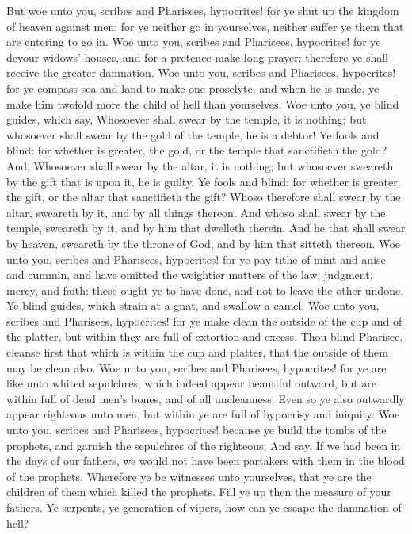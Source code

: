  But woe unto you, scribes and Pharisees, hypocrites! for
ye shut up the kingdom of heaven against men: for ye neither go in
yourselves, neither suffer ye them that are entering to go in.
 Woe unto you, scribes and Pharisees, hypocrites! for ye
devour widows' houses, and for a pretence make long prayer: therefore ye
shall receive the greater damnation.  Woe unto you, scribes
and Pharisees, hypocrites! for ye compass sea and land to make one
proselyte, and when he is made, ye make him twofold more the child of
hell than yourselves.  Woe unto you, ye blind guides, which
say, Whosoever shall swear by the temple, it is nothing; but whosoever
shall swear by the gold of the temple, he is a debtor!  Ye
fools and blind: for whether is greater, the gold, or the temple that
sanctifieth the gold?  And, Whosoever shall swear by the
altar, it is nothing; but whosoever sweareth by the gift that is upon
it, he is guilty.  Ye fools and blind: for whether is
greater, the gift, or the altar that sanctifieth the gift? 
Whoso therefore shall swear by the altar, sweareth by it, and by all
things thereon.  And whoso shall swear by the temple,
sweareth by it, and by him that dwelleth therein.  And he
that shall swear by heaven, sweareth by the throne of God, and by him
that sitteth thereon.  Woe unto you, scribes and Pharisees,
hypocrites! for ye pay tithe of mint and anise and cummin, and have
omitted the weightier matters of the law, judgment, mercy, and faith:
these ought ye to have done, and not to leave the other undone.
 Ye blind guides, which strain at a gnat, and swallow a
camel.  Woe unto you, scribes and Pharisees, hypocrites!
for ye make clean the outside of the cup and of the platter, but within
they are full of extortion and excess.  Thou blind
Pharisee, cleanse first that which is within the cup and platter, that
the outside of them may be clean also.  Woe unto you,
scribes and Pharisees, hypocrites! for ye are like unto whited
sepulchres, which indeed appear beautiful outward, but are within full
of dead men's bones, and of all uncleanness.  Even so ye
also outwardly appear righteous unto men, but within ye are full of
hypocrisy and iniquity.  Woe unto you, scribes and
Pharisees, hypocrites! because ye build the tombs of the prophets, and
garnish the sepulchres of the righteous,  And say, If we
had been in the days of our fathers, we would not have been partakers
with them in the blood of the prophets.  Wherefore ye be
witnesses unto yourselves, that ye are the children of them which killed
the prophets.  Fill ye up then the measure of your fathers.
 Ye serpents, ye generation of vipers, how can ye escape
the damnation of hell?

